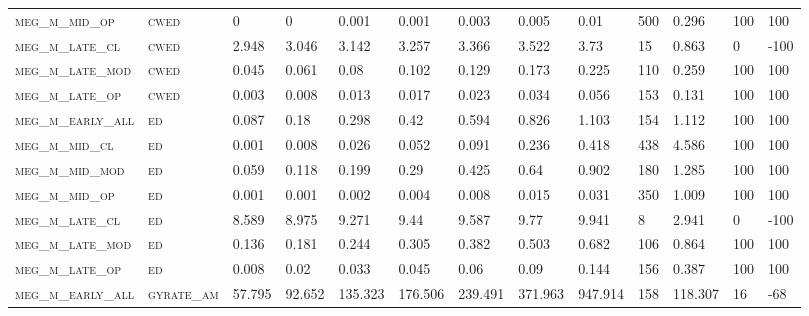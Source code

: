 \begin{landscape}
\begin{center}
\begin{footnotesize}
\begin{longtable}{lllllllllllll}
\textsc{meg\_m\_mid\_op   } & \textsc{cwed      }   & 0        & 0        & 0.001    & 0.001    & 0.003    & 0.005    & 0.01     & 500    & 0.296         & 100           & 100             \\
\textsc{meg\_m\_late\_cl  } & \textsc{cwed      }   & 2.948    & 3.046    & 3.142    & 3.257    & 3.366    & 3.522    & 3.73     & 15     & 0.863         & 0             & -100            \\
\textsc{meg\_m\_late\_mod } & \textsc{cwed      }   & 0.045    & 0.061    & 0.08     & 0.102    & 0.129    & 0.173    & 0.225    & 110    & 0.259         & 100           & 100             \\
\textsc{meg\_m\_late\_op  } & \textsc{cwed      }   & 0.003    & 0.008    & 0.013    & 0.017    & 0.023    & 0.034    & 0.056    & 153    & 0.131         & 100           & 100             \\
\textsc{meg\_m\_early\_all} & \textsc{ed        }   & 0.087    & 0.18     & 0.298    & 0.42     & 0.594    & 0.826    & 1.103    & 154    & 1.112         & 100           & 100             \\
\textsc{meg\_m\_mid\_cl   } & \textsc{ed        }   & 0.001    & 0.008    & 0.026    & 0.052    & 0.091    & 0.236    & 0.418    & 438    & 4.586         & 100           & 100             \\
\textsc{meg\_m\_mid\_mod  } & \textsc{ed        }   & 0.059    & 0.118    & 0.199    & 0.29     & 0.425    & 0.64     & 0.902    & 180    & 1.285         & 100           & 100             \\
\textsc{meg\_m\_mid\_op   } & \textsc{ed        }   & 0.001    & 0.001    & 0.002    & 0.004    & 0.008    & 0.015    & 0.031    & 350    & 1.009         & 100           & 100             \\
\textsc{meg\_m\_late\_cl  } & \textsc{ed        }   & 8.589    & 8.975    & 9.271    & 9.44     & 9.587    & 9.77     & 9.941    & 8      & 2.941         & 0             & -100            \\
\textsc{meg\_m\_late\_mod } & \textsc{ed        }   & 0.136    & 0.181    & 0.244    & 0.305    & 0.382    & 0.503    & 0.682    & 106    & 0.864         & 100           & 100             \\
\textsc{meg\_m\_late\_op  } & \textsc{ed        }   & 0.008    & 0.02     & 0.033    & 0.045    & 0.06     & 0.09     & 0.144    & 156    & 0.387         & 100           & 100             \\
\textsc{meg\_m\_early\_all} & \textsc{gyrate\_am}   & 57.795   & 92.652   & 135.323  & 176.506  & 239.491  & 371.963  & 947.914  & 158    & 118.307       & 16            & -68             \\

\end{longtable}
\end{footnotesize}
\end{center}
\end{landscape}
